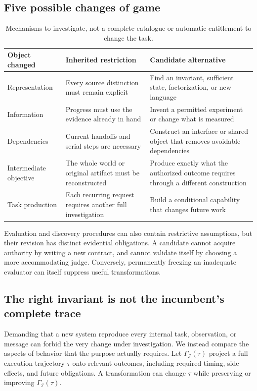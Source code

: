 \documentclass[11pt,letterpaper]{article}
\newcommand{\I}{\mathcal I}\newcommand{\A}{\mathcal A}
\theoremstyle{remark}\newtheorem{remark}{Remark}[section]
\begin{document}
\subsection{Five possible changes of game}
\begin{table}[htbp]
\centering\small
\caption{Mechanisms to investigate, not a complete catalogue or automatic entitlement to change the task.}
\begin{tabularx}{\linewidth}{@{}P{.18\linewidth}YY@{}}
\toprule
Object changed & Inherited restriction & Candidate alternative\\
\midrule
Representation & Every source distinction must remain explicit & Find an invariant, sufficient state, factorization, or new language\\
Information & Progress must use the evidence already in hand & Invent a permitted experiment or change what is measured\\
Dependencies & Current handoffs and serial steps are necessary & Construct an interface or shared object that removes avoidable dependencies\\
Intermediate objective & The whole world or original artifact must be reconstructed & Produce exactly what the authorized outcome requires through a different construction\\
Task production & Each recurring request requires another full investigation & Build a conditional capability that changes future work\\
\bottomrule
\end{tabularx}
\end{table}
Evaluation and discovery procedures can also contain restrictive assumptions, but their revision has distinct evidential obligations. A candidate cannot acquire authority by writing a new contract, and cannot validate itself by choosing a more accommodating judge. Conversely, permanently freezing an inadequate evaluator can itself suppress useful transformations.

\subsection{The right invariant is not the incumbent's complete trace}
Demanding that a new system reproduce every internal task, observation, or message can forbid the very change under investigation. We instead compare the aspects of behavior that the purpose actually requires. Let $\Gamma_{\I}(\tau)$ project a full execution trajectory $\tau$ onto relevant outcomes, including required timing, side effects, and future obligations. A transformation can change $\tau$ while preserving or improving $\Gamma_{\I}(\tau)$.
\end{document}
